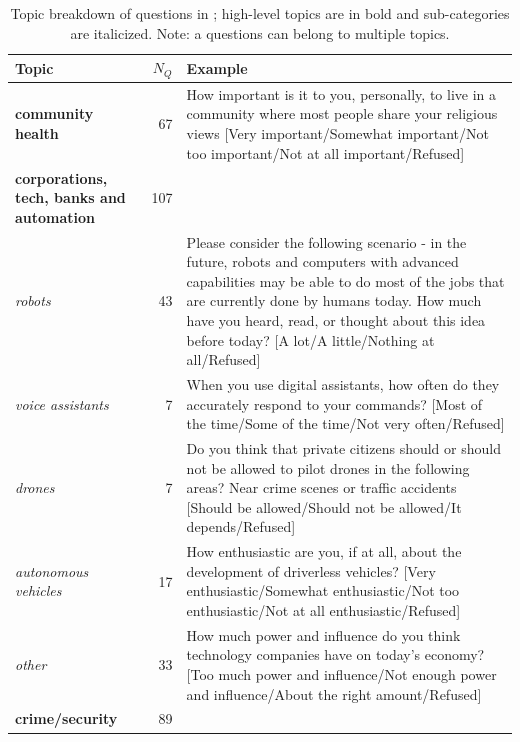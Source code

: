 \begin{table}[!h]

    \caption{Topic breakdown of questions in \bname{}; high-level topics are in bold and sub-categories are italicized. Note: a questions can belong to multiple topics. }
    \label{tab:topic}
    \renewcommand{\arraystretch}{1.5}
    \begin{center}
    \begin{small}

        \begin{tabular}{p{4.5cm}rp{10.5cm}}
            \toprule
            Topic &  $N_Q$ & Example \\
            \midrule
            \textbf{community health} &    67 & How important is it to you, personally, to live in a community where most people share your religious views [Very important/Somewhat important/Not too important/Not at all important/Refused]  \\ \hline
            \textbf{corporations, tech, banks and automation} &    107 & \\ 
            \textit{robots} & 43 & Please consider the following scenario - in the future, robots and computers with advanced capabilities may be able to do most of the jobs that are currently done by humans today. How much have you heard, read, or thought about this idea before today? [A lot/A little/Nothing at all/Refused] \\
            \textit{voice assistants} & 7 & When you use digital assistants, how often do they accurately respond to your commands? [Most of the time/Some of the time/Not very often/Refused] \\
            \textit{drones} & 7 & Do you think that private citizens should or should not be allowed to pilot drones in the following areas? Near crime scenes or traffic accidents [Should be allowed/Should not be allowed/It depends/Refused] \\
            \textit{autonomous vehicles} & 17 & How enthusiastic are you, if at all, about the development of driverless vehicles? [Very enthusiastic/Somewhat enthusiastic/Not too enthusiastic/Not at all enthusiastic/Refused] \\
            \textit{other} & 33 & How much power and influence do you think technology companies have on today's economy? [Too much power and influence/Not enough power and influence/About the right amount/Refused] \\ \hline
            \textbf{crime/security} &    89 &  \\

\end{tabular}
\end{small}
\end{center}
\end{table}
